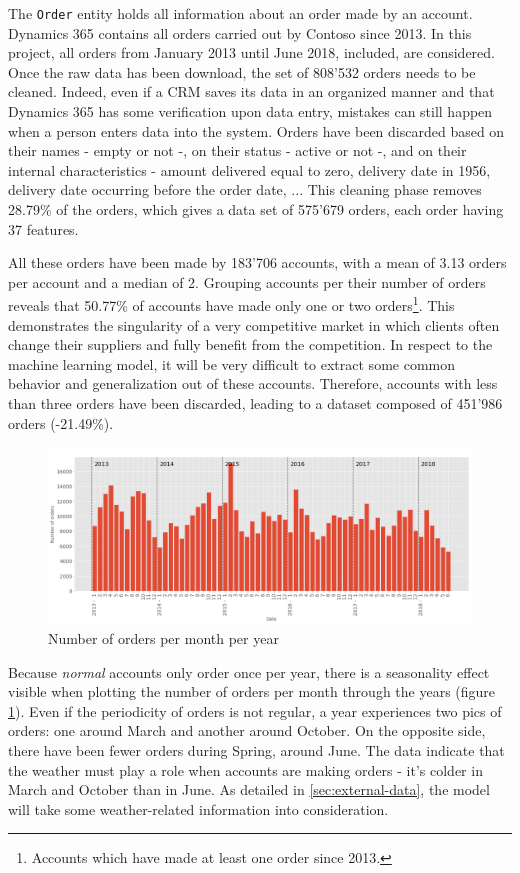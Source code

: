 The \texttt{Order} entity holds all information about an order made by an account. Dynamics 365 contains all orders carried out by Contoso since 2013. In this project, all orders from January 2013 until June 2018, included, are considered. Once the raw data has been download, the set of 808'532 orders needs to be cleaned. Indeed, even if a CRM saves its data in an organized manner and that Dynamics 365 has some verification upon data entry, mistakes can still happen when a person enters data into the system. Orders have been discarded based on their names - empty or not -, on their status - active or not -, and on their internal characteristics - amount delivered equal to zero, delivery date in 1956, delivery date occurring before the order date, ... This cleaning phase removes 28.79\% of the orders, which gives a data set of 575'679 orders, each order having 37 features.

All these orders have been made by 183'706 accounts, with a mean of 3.13 orders per account and a median of 2. Grouping accounts per their number of orders reveals that 50.77\% of accounts have made only one or two orders\footnote{Accounts which have made at least one order since 2013.}. This demonstrates the singularity of a very competitive market in which clients often change their suppliers and fully benefit from the competition. In respect to the machine learning model, it will be very difficult to extract some common behavior and generalization out of these accounts. Therefore, accounts with less than three orders have been discarded, leading to a dataset composed of 451'986 orders (-21.49\%).

\begin{figure}[h]
    \centering
    \includegraphics[width=15cm]{images/order_month_year.png}
    \caption{Number of orders per month per year}
    \label{fig:order_per_monthyear}
\end{figure}

Because \textit{normal} accounts only order once per year, there is a seasonality effect visible when plotting the number of orders per month through  the years (figure \ref{fig:order_per_monthyear}). Even if the periodicity of orders is not regular, a year experiences two pics of orders: one around March and another around October. On the opposite side, there have been fewer orders during Spring, around June. The data indicate that the weather must play a role when accounts are making orders - it's colder in March and October than in June. As detailed in \ref{sec:external-data}, the model will take some weather-related information into consideration.

